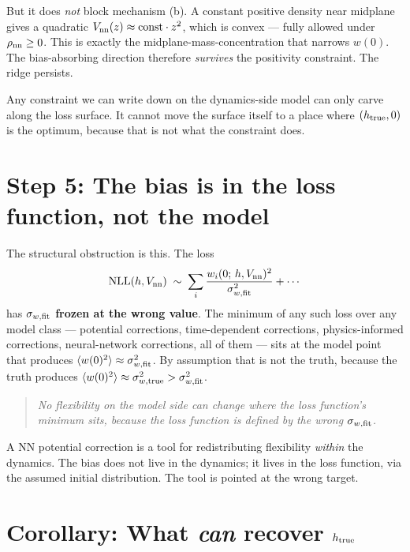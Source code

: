 \documentclass[11pt]{article}
\begin{document}
But it does \emph{not} block mechanism (b).  A constant positive density near
midplane gives a quadratic $V_{\rm nn}(z) \approx \mathrm{const}\cdot z^2$,
which is convex --- fully allowed under $\rho_{\rm nn} \ge 0$.  This is exactly
the midplane-mass-concentration that narrows $w(0)$.  The bias-absorbing
direction therefore \emph{survives} the positivity constraint.  The ridge
persists.

Any constraint we can write down on the dynamics-side model can only carve
along the loss surface.  It cannot move the surface itself to a place where
$(h_{\rm true}, 0)$ is the optimum, because that is not what the constraint
does.

\section*{Step 5: The bias is in the loss function, not the model}

The structural obstruction is this.  The loss
\begin{equation}
  \mathrm{NLL}(h, V_{\rm nn}) \;\sim\; \sum_i \frac{w_i(0;\,h, V_{\rm nn})^2}{\sigma_{w,\rm fit}^2} + \cdots
\end{equation}
has $\sigma_{w,\rm fit}$ \textbf{frozen at the wrong value}.  The minimum of
any such loss over any model class --- potential corrections, time-dependent
corrections, physics-informed corrections, neural-network corrections, all of
them --- sits at the model point that produces
$\langle w(0)^2\rangle \approx \sigma_{w,\rm fit}^2$.  By assumption that is
not the truth, because the truth produces
$\langle w(0)^2\rangle \approx \sigma_{w,\rm true}^2 > \sigma_{w,\rm fit}^2$.

\begin{quote}
\emph{No flexibility on the model side can change where the loss function's
minimum sits, because the loss function is defined by the wrong
$\sigma_{w,\rm fit}$.}
\end{quote}

A NN potential correction is a tool for redistributing flexibility
\emph{within} the dynamics.  The bias does not live in the dynamics; it lives
in the loss function, via the assumed initial distribution.  The tool is
pointed at the wrong target.

\section*{Corollary: What \emph{can} recover $h_{\rm true}$}
\end{document}
